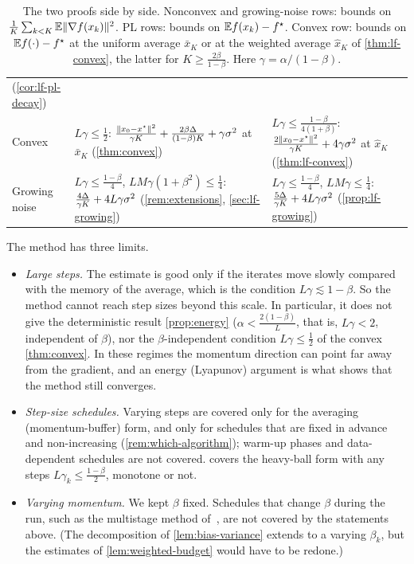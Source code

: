 \begin{table}[ht]
\begin{tabularx}{\textwidth}{@{}>{\raggedright\arraybackslash}p{2.2cm}
  >{\raggedright\arraybackslash}X >{\raggedright\arraybackslash}X@{}}
  (\cref{cor:lf-pl-decay})\\
Convex &
  $L\gamma\le\frac12$: $\frac{\lVert x_0-x^\star\rVert^2}{\gamma K}+\frac{2\beta\Delta}{(1-\beta)K}+\gamma\sigma^2$ at $\bar x_K$
  (\cref{thm:convex}) &
  $L\gamma\le\frac{1-\beta}{4(1+\beta)}$: $\frac{2\lVert x_0-x^\star\rVert^2}{\gamma K}+4\gamma\sigma^2$ at $\hat x_K$
  (\cref{thm:lf-convex})\\
Growing noise &
  $L\gamma\le\frac{1-\beta}4$, $LM\gamma(1+\beta^2)\le\frac14$: $\frac{4\Delta}{\gamma K}+4L\gamma\sigma^2$
  (\cref{rem:extensions}, \cref{sec:lf-growing}) &
  $L\gamma\le\frac{1-\beta}4$, $LM\gamma\le\frac14$: $\frac{5\Delta}{\gamma K}+4L\gamma\sigma^2$ (\cref{prop:lf-growing})\\
\bottomrule
\end{tabularx}
\caption{The two proofs side by side. Nonconvex and growing-noise rows: bounds on
$\frac1K\sum_{k<K}\mathbb{E}\lVert \nabla f(x_k)\rVert^2$. PL rows: bounds on $\mathbb{E} f(x_k)-f^\star$. Convex row: bounds
on $\mathbb{E} f(\cdot)-f^\star$ at the uniform average $\bar x_K$ or at the weighted average $\hat x_K$
of \cref{thm:lf-convex}, the latter for $K\ge\frac{2\beta}{1-\beta}$. Here
$\gamma=\alpha/(1-\beta)$.}
\label{tab:lf-vs-lyap}
\end{table}

The method has three limits.
\begin{itemize}
\item \emph{Large steps.} The estimate is good only if the iterates move slowly compared
  with the memory of the average, which is the condition $L\gamma\lesssim1-\beta$. So the
  method cannot reach step sizes beyond this scale. In particular, it does not give the
  deterministic result \cref{prop:energy} ($\alpha<\frac{2(1-\beta)}{L}$, that is,
  $L\gamma<2$, independent of $\beta$), nor the $\beta$-independent condition
  $L\gamma\le\frac12$ of the convex \cref{thm:convex}. In these regimes the momentum
  direction can point far away from the gradient, and an energy (Lyapunov) argument is
  what shows that the method still converges.
\item \emph{Step-size schedules.} Varying steps are covered only for the averaging
  (momentum-buffer) form, and only for schedules that are fixed in advance and
  non-increasing (\cref{rem:which-algorithm}); warm-up phases and data-dependent schedules are
  not covered.  covers the heavy-ball form with any steps
  $L\gamma_k\le\frac{1-\beta}{2}$, monotone or not.
\item \emph{Varying momentum.} We kept $\beta$ fixed. Schedules that change $\beta$ during the
  run, such as the multistage method of~\cite{liu2020}, are not covered by the statements
  above. (The decomposition of \cref{lem:bias-variance} extends to a varying $\beta_k$, but
  the estimates of \cref{lem:weighted-budget} would have to be redone.)
\end{itemize}

